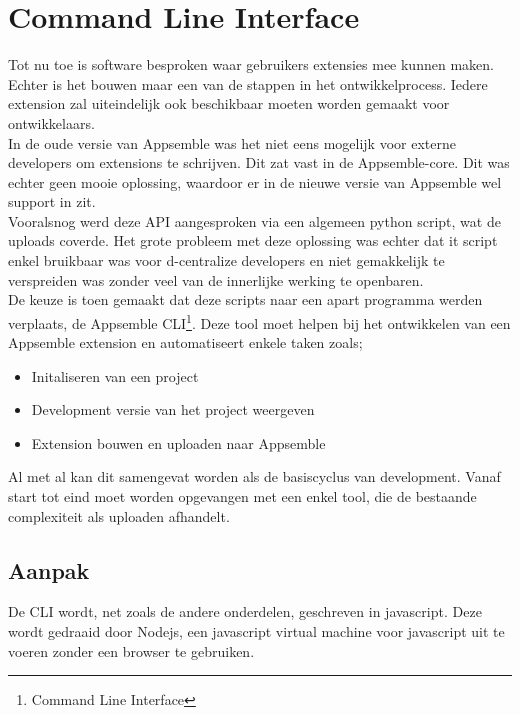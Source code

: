 \chapter{Command Line Interface}

Tot nu toe is software besproken waar gebruikers extensies mee kunnen maken. Echter is het bouwen maar een van de stappen in het ontwikkelprocess. Iedere extension zal uiteindelijk ook beschikbaar moeten worden gemaakt voor ontwikkelaars. \\

In de oude versie van Appsemble was het niet eens mogelijk voor externe developers om extensions te schrijven. Dit zat vast in de Appsemble-core. Dit was echter geen mooie oplossing, waardoor er in de nieuwe versie van Appsemble wel support in zit. \\

Vooralsnog werd deze API aangesproken via een algemeen python script, wat de uploads coverde. Het grote probleem met deze oplossing was echter dat it script enkel bruikbaar was voor d-centralize developers en niet gemakkelijk te verspreiden was zonder veel van de innerlijke werking te openbaren. \\

De keuze is toen gemaakt dat deze scripts naar een apart programma werden verplaats, de Appsemble CLI\footnote{Command Line Interface}. Deze tool moet helpen bij het ontwikkelen van een Appsemble extension en automatiseert enkele taken zoals;

\begin{itemize}
	\item Initaliseren van een project
	\item Development versie van het project weergeven
	\item Extension bouwen en uploaden naar Appsemble
\end{itemize}

Al met al kan dit samengevat worden als de basiscyclus van development. Vanaf start tot eind moet worden opgevangen met een enkel tool, die de bestaande complexiteit als uploaden afhandelt.

\section{Aanpak}

De CLI wordt, net zoals de andere onderdelen, geschreven in javascript. Deze wordt gedraaid door Nodejs, een javascript virtual machine voor javascript uit te voeren zonder een browser te gebruiken. \\


